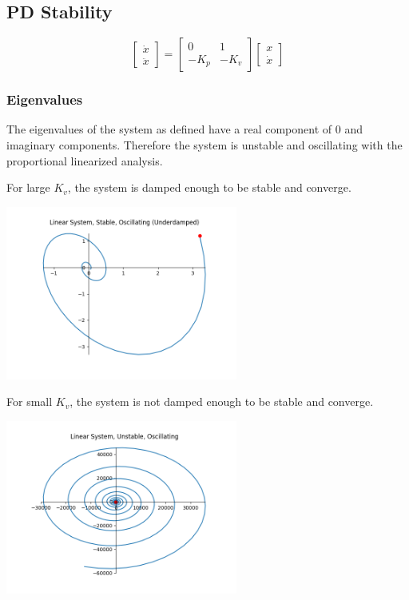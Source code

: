 \documentclass[12pt, letterpaper, oneside, notitlepage, onecolumn]{article}
\begin{document}
\subsection{PD Stability}

\begin{equation}
\begin{bmatrix}
\dot{x} \\
\ddot{x}
\end{bmatrix}
=
\begin{bmatrix}
0 & 1 \\
-K_{p} & -K_{v}
\end{bmatrix}
%
\begin{bmatrix}
x \\
\dot{x}
\end{bmatrix}
\end{equation}

\subsubsection{Eigenvalues}

The eigenvalues of the system as defined have a real component of 0 and
imaginary components. Therefore the system is unstable and oscillating with the
proportional linearized analysis.

For large $K_{v}$, the system is damped enough to be stable and converge.

\begin{center}
\includegraphics[width=3in,angle=0]{linear_pd_bigV}
\end{center}

For small $K_{v}$, the system is not damped enough to be stable and converge.

\begin{center}
\includegraphics[width=3in,angle=0]{linear_pd_smallV}
\end{center}
\end{document}
